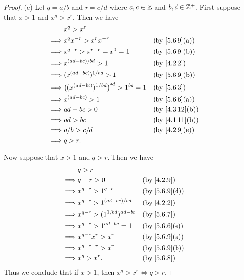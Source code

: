 \begin{proof}{(e)}
  Let \(q = a / b\) and \(r = c / d\) where \(a, c \in \mathbb{Z}\) and \(b, d \in \mathbb{Z}^+\).
  First suppose that \(x > 1\) and \(x^q > x^r\).
  Then we have
  \begin{align*}
             & x^q > x^r                                                                \\
    \implies & x^q x^{-r} > x^r x^{-r}                              &  & \by{5.6.9}[a]  \\
    \implies & x^{q - r} > x^{r - r} = x^0 = 1                      &  & \by{5.6.9}[b]  \\
    \implies & x^{(ad - bc) / bd} > 1                               &  & \by{4.2.2}     \\
    \implies & (x^{(ad - bc)})^{1 / bd} > 1                         &  & \by{5.6.9}[b]  \\
    \implies & \big((x^{(ad - bc)})^{1 / bd}\big)^{bd} > 1^{bd} = 1 &  & \by{5.6.3}     \\
    \implies & x^{(ad - bc)} > 1                                    &  & \by{5.6.6}[a]  \\
    \implies & ad - bc > 0                                          &  & \by{4.3.12}[b] \\
    \implies & ad > bc                                              &  & \by{4.1.11}[b] \\
    \implies & a / b > c / d                                        &  & \by{4.2.9}[e]  \\
    \implies & q > r.
  \end{align*}

  Now suppose that \(x > 1\) and \(q > r\).
  Then we have
  \begin{align*}
             & q > r                                                 \\
    \implies & q - r > 0                          &  & \by{4.2.9}    \\
    \implies & x^{q - r} > 1^{q - r}              &  & \by{5.6.9}[d] \\
    \implies & x^{q - r} > 1^{(ad - bc) / bd}     &  & \by{4.2.2}    \\
    \implies & x^{q - r} > (1^{1 / bd})^{ad - bc} &  & \by{5.6.7}    \\
    \implies & x^{q - r} > 1^{ad - bc} = 1        &  & \by{5.6.6}[e] \\
    \implies & x^{q - r} x^r > x^r                &  & \by{5.6.9}[a] \\
    \implies & x^{q - r + r} > x^r                &  & \by{5.6.9}[b] \\
    \implies & x^q > x^r.                         &  & \by{5.6.8}
  \end{align*}
  Thus we conclude that if \(x > 1\), then \(x^q > x^r \iff q > r\).


\end{proof}
